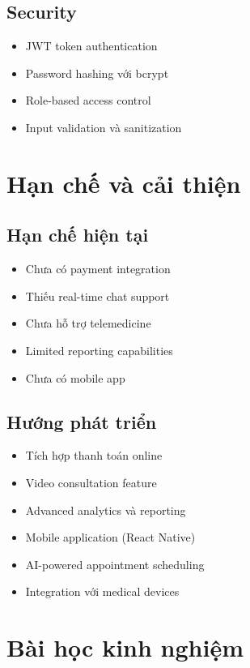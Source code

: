 \documentclass[12pt,a4paper]{report}
\begin{document}
\subsection{Security}
\begin{itemize}
    \item JWT token authentication
    \item Password hashing với bcrypt
    \item Role-based access control
    \item Input validation và sanitization
\end{itemize}

\section{Hạn chế và cải thiện}

\subsection{Hạn chế hiện tại}
\begin{itemize}
    \item Chưa có payment integration
    \item Thiếu real-time chat support
    \item Chưa hỗ trợ telemedicine
    \item Limited reporting capabilities
    \item Chưa có mobile app
\end{itemize}

\subsection{Hướng phát triển}
\begin{itemize}
    \item Tích hợp thanh toán online
    \item Video consultation feature
    \item Advanced analytics và reporting
    \item Mobile application (React Native)
    \item AI-powered appointment scheduling
    \item Integration với medical devices
\end{itemize}

\section{Bài học kinh nghiệm}
\end{document}
